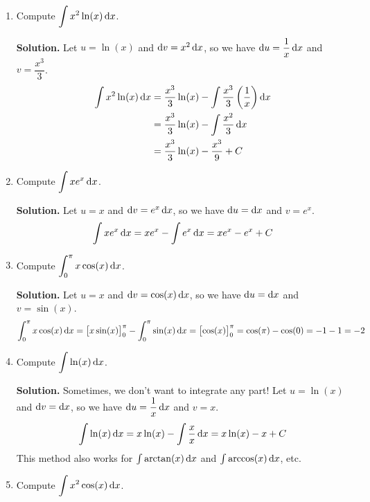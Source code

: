 \begin{Example}{}{}
    \begin{enumerate}[label=(\roman*)]
        \item Compute $ \displaystyle \int x^2\ln(x)\odif{x}  $.

              \textbf{Solution.} Let $ u=\ln(x) $ and $ \odif{v}=x^2\odif{x} $, so we have
              $ \odif{u}=\dfrac{1}{x} \odif{x} $ and $ v=\dfrac{x^3}{3} $.
              \begin{align*}
                  \int x^2\ln(x)\odif{x}
                   & =\frac{x^3}{3} \ln(x)-\int \frac{x^3}{3} \left( \frac{1}{x} \right) \odif{x} \\
                   & =\frac{x^3}{3} \ln(x)-\int \frac{x^2}{3}\odif{x}                             \\
                   & =\frac{x^3}{3} \ln(x)-\frac{x^3}{9} +C
              \end{align*}
        \item Compute $ \displaystyle \int x e^x\odif{x} $.

              \textbf{Solution.} Let $ u=x $ and $ \odif{v}=e^x\odif{x} $, so we have $ \odif{u}=\odif{x} $ and $ v=e^x $.
              \[
                  \int x e^x\odif{x}
                  =x e^x-\int e^x\odif{x}
                  =x e^x-e^x+C
              \]
        \item Compute $ \displaystyle \int_{0}^{\pi} x\cos(x)\odif{x} $.

              \textbf{Solution.} Let $ u=x $ and $ \odif{v}=\cos(x)\odif{x} $, so we have $ \odif{u}=\odif{x} $ and $ v=\sin(x) $.
              \[
                  \int_{0}^{\pi} x\cos(x)\odif{x}
                  =\bigl[x\sin(x)\bigr]^{\pi}_{0}-\int_{0}^{\pi} \sin(x)\odif{x}
                  =\bigl[\cos(x)\bigr]^{\pi}_{0}
                  =\cos(\pi)-\cos(0)
                  =-1-1
                  =-2
              \]
        \item Compute $ \displaystyle \int \ln(x)\odif{x} $.

              \textbf{Solution.} Sometimes, we don't want to integrate any part! Let $ u=\ln(x) $
              and $ \odif{v}=\odif{x} $, so we have $ \odif{u}=\dfrac{1}{x}\odif{x} $ and $ v=x $.
              \[
                  \int \ln(x)\odif{x}
                  =x\ln(x)-\int \frac{x}{x} \odif{x}
                  =x\ln(x)-x+C
              \]
              This method also works for $ \int \arctan(x)\odif{x} $ and
              $ \int \arccos(x)\odif{x} $, etc.
        \item Compute $ \displaystyle  \int x^2\cos(x)\odif{x} $.


\end{enumerate}
\end{Example}
